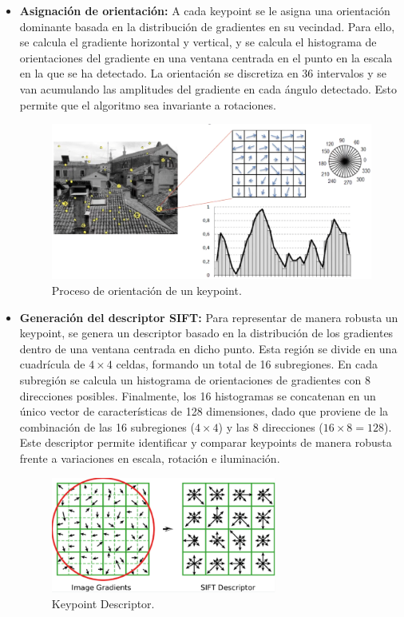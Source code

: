 \documentclass[a4paper]{article}
\begin{document}
\begin{itemize}
      \item \textbf{Asignación de orientación:}  
      A cada keypoint se le asigna una orientación dominante basada en la distribución de gradientes en su vecindad. Para ello, se calcula el gradiente horizontal y vertical, y se calcula el histograma de orientaciones del gradiente en una ventana centrada en el punto en la escala en la que se ha detectado. La orientación 
      se discretiza en 36 intervalos y se van acumulando las amplitudes del gradiente en cada ángulo detectado. Esto permite que el algoritmo sea invariante a rotaciones.
      \begin{figure}[H]
        \centering
        \includegraphics[width=1.1\textwidth]{images/sift_orientacion.png}
        \caption{Proceso de orientación de un keypoint.}
    \end{figure}


    \item \textbf{Generación del descriptor SIFT:}  
    Para representar de manera robusta un keypoint, se genera un descriptor basado en la distribución de los gradientes dentro de una ventana centrada en dicho punto.  
    Esta región se divide en una cuadrícula de \(4 \times 4\) celdas, formando un total de 16 subregiones.  
    En cada subregión se calcula un histograma de orientaciones de gradientes con 8 direcciones posibles.  
    Finalmente, los 16 histogramas se concatenan en un único vector de características de 128 dimensiones, dado que proviene de la combinación de las 16 subregiones (\(4 \times 4\)) y las 8 direcciones (\(16 \times 8 = 128\)).  
    Este descriptor permite identificar y comparar keypoints de manera robusta frente a variaciones en escala, rotación e iluminación.

   
      \begin{figure}[H]
        \centering
        \includegraphics[width=0.7\textwidth]{images/sift_descrip.png}
        \caption{Keypoint Descriptor.}
    \end{figure}

    \end{itemize}
  
\end{document}
